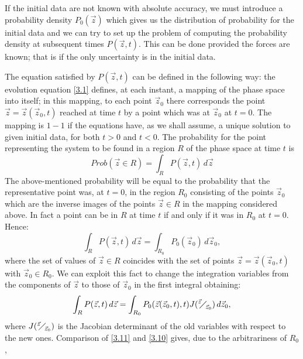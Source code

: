 If the initial data are not known with absolute accuracy, we must introduce a probability density \(P_0(\vec{z})\) which gives us the distribution of probability for the initial data and we can try to set up the problem of computing the probability density at subsequent times \(P(\vec{z}, t)\). This can be done provided the forces are known; that is if the only uncertainty is in the initial data. 

The equation satisfied by \(P(\vec{z}, t)\) can be defined in the following way: the evolution equation \eqref{3.1} defines, at each instant, a mapping of the phase space into itself; in this mapping, to each point \(\vec{z}_0\) there corresponds the point \(\vec{z} = \vec{z}(\vec{z}_0, t)\) reached at time \(t\) by a point which was at \(\vec{z}_0\) at \(t=0\). The mapping is \(1-1\) if the equations have, as we shall assume, a unique solution to given initial data, for both \(t>0\) and \(t<0\). The probability for the point representing the system to be found in a region \(R\) of the phase space at time \(t\) is 
\begin{equation}
    Prob(\vec{z} \in R) = \int_R P(\vec{z}, t) \, d\vec{z}
    \label{3.9}
\end{equation}
The above-mentioned probability will be equal to the probability that the representative point was, at \(t=0\), in the region \(R_0\) consisting of the points \(\vec{z}_0\) which are the inverse images of the points \(\vec{z} \in R\) in the mapping considered above. In fact a point can be in \(R\) at time \(t\) if and only if it was in \(R_0\) at \(t=0\). Hence:
\begin{equation}
    \int_R P(\vec{z}, t) \, d\vec{z} = \int_{R_0} P_0(\vec{z}_0) \, d\vec{z}_0,
    \label{3.10}
\end{equation}
where the set of values of \(\vec{z} \in R\) coincides with the set of points \(\vec{z} = \vec{z}(\vec{z}_0, t)\) with \(\vec{z}_0 \in R_0\). We can exploit this fact to change the integration variables from the components of \(\vec{z}\) to those of \(\vec{z}_0\) in the first integral obtaining:
\begin{equation}
    \int_R P(\vec{z}, t) \, d\vec{z} = \int_{R_0} P_0(\vec{z}(\vec{z}_0, t), t) J({}^{\vec{z}}{\mskip -5mu\diagup\mskip -3mu}_{\vec{z}_0}) \, d\vec{z}_0, \label{3.11}
\end{equation}
where \(J({}^{\vec{z}}{\mskip -5mu\diagup\mskip -3mu}_{\vec{z}_0})\) is the Jacobian determinant of the old variables with respect to the new ones. Comparison of \eqref{3.11} and \eqref{3.10} gives, due to the arbitrariness of \(R_0\), 
